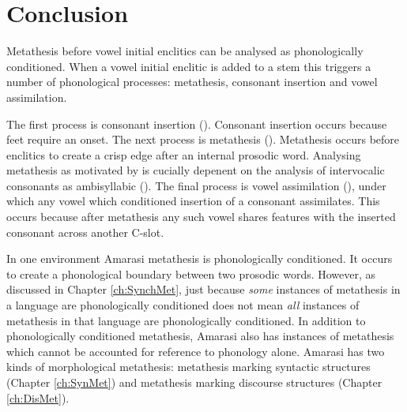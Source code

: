 \section{Conclusion}
Metathesis before vowel initial enclitics can be
analysed as phonologically conditioned.
When a vowel initial enclitic is added to a stem
this triggers a number of phonological processes: metathesis,
consonant insertion and vowel assimilation.

The first process is consonant insertion ().
Consonant insertion occurs because feet require an onset.
The next process is metathesis ().
Metathesis occurs before enclitics to create a crisp edge after an internal prosodic word.
Analysing metathesis as motivated by  is cucially depenent
on the analysis of intervocalic consonants as ambisyllabic ().
The final process is vowel assimilation (),
under which any vowel which conditioned insertion of a consonant assimilates.
This occurs because after metathesis any such vowel shares
features with the inserted consonant across another C-slot.

In one environment Amarasi metathesis is phonologically conditioned.
It occurs to create a phonological boundary between two prosodic words.
However, as discussed in Chapter \ref{ch:SynchMet},
just because \emph{some} instances of metathesis in a language
are phonologically conditioned does not mean \emph{all}
instances of metathesis in that language are phonologically conditioned.
In addition to phonologically conditioned metathesis,
Amarasi also has instances of metathesis which
cannot be accounted for reference to phonology alone.
Amarasi has two kinds of morphological metathesis:
metathesis marking syntactic structures (Chapter \ref{ch:SynMet})
and metathesis marking discourse structures (Chapter \ref{ch:DisMet}).